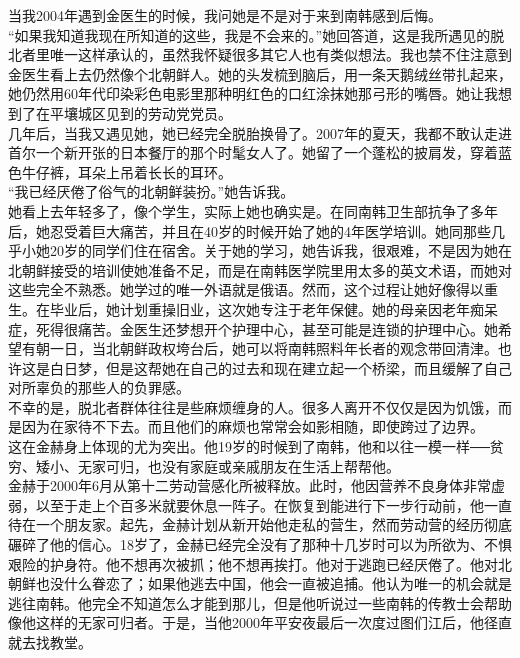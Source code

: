 当我2004年遇到金医生的时候，我问她是不是对于来到南韩感到后悔。\\

“如果我知道我现在所知道的这些，我是不会来的。”她回答道，这是我所遇见的脱北者里唯一这样承认的，虽然我怀疑很多其它人也有类似想法。我也禁不住注意到金医生看上去仍然像个北朝鲜人。她的头发梳到脑后，用一条天鹅绒丝带扎起来，她仍然用60年代印染彩色电影里那种明红色的口红涂抹她那弓形的嘴唇。她让我想到了在平壤城区见到的劳动党党员。\\

几年后，当我又遇见她，她已经完全脱胎换骨了。2007年的夏天，我都不敢认走进首尔一个新开张的日本餐厅的那个时髦女人了。她留了一个蓬松的披肩发，穿着蓝色牛仔裤，耳朵上吊着长长的耳环。\\

“我已经厌倦了俗气的北朝鲜装扮。”她告诉我。\\

她看上去年轻多了，像个学生，实际上她也确实是。在同南韩卫生部抗争了多年后，她忍受着巨大痛苦，并且在40岁的时候开始了她的4年医学培训。她同那些几乎小她20岁的同学们住在宿舍。关于她的学习，她告诉我，很艰难，不是因为她在北朝鲜接受的培训使她准备不足，而是在南韩医学院里用太多的英文术语，而她对这些完全不熟悉。她学过的唯一外语就是俄语。然而，这个过程让她好像得以重生。在毕业后，她计划重操旧业，这次她专注于老年保健。她的母亲因老年痴呆症，死得很痛苦。金医生还梦想开个护理中心，甚至可能是连锁的护理中心。她希望有朝一日，当北朝鲜政权垮台后，她可以将南韩照料年长者的观念带回清津。也许这是白日梦，但是这帮她在自己的过去和现在建立起一个桥梁，而且缓解了自己对所辜负的那些人的负罪感。\\

不幸的是，脱北者群体往往是些麻烦缠身的人。很多人离开不仅仅是因为饥饿，而是因为在家待不下去。而且他们的麻烦也常常会如影相随，即使跨过了边界。\\

这在金赫身上体现的尤为突出。他19岁的时候到了南韩，他和以往一模一样──贫穷、矮小、无家可归，也没有家庭或亲戚朋友在生活上帮帮他。\\

金赫于2000年6月从第十二劳动营感化所被释放。此时，他因营养不良身体非常虚弱，以至于走上个百多米就要休息一阵子。在恢复到能进行下一步行动前，他一直待在一个朋友家。起先，金赫计划从新开始他走私的营生，然而劳动营的经历彻底碾碎了他的信心。18岁了，金赫已经完全没有了那种十几岁时可以为所欲为、不惧艰险的护身符。他不想再次被抓；他不想再挨打。他对于逃跑已经厌倦了。他对北朝鲜也没什么眷恋了；如果他逃去中国，他会一直被追捕。他认为唯一的机会就是逃往南韩。他完全不知道怎么才能到那儿，但是他听说过一些南韩的传教士会帮助像他这样的无家可归者。于是，当他2000年平安夜最后一次度过图们江后，他径直就去找教堂。\\

